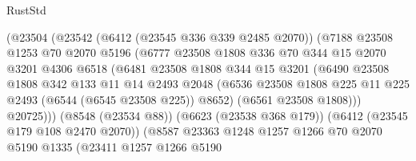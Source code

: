 \begin{lexlean}{RustStd}
\begin{coremodule}
                          (@23504
                            (@23542
                              (@6412 (@23545 @336 @339 @2485 @2070))
                              (@7188
                                @23508
                                @1253
                                @70
                                @2070
                                @5196
                                (@6777
                                  @23508
                                  @1808
                                  @336
                                  @70
                                  @344
                                  @15
                                  @2070
                                  @3201
                                  @4306
                                  @6518
                                  (@6481
                                    @23508
                                    @1808
                                    @344
                                    @15
                                    @3201
                                    (@6490
                                      @23508
                                      @1808
                                      @342
                                      @133
                                      @11
                                      @14
                                      @2493
                                      @2048
                                      (@6536
                                        @23508
                                        @1808
                                        @225
                                        @11
                                        @225
                                        @2493
                                        (@6544 (@6545 @23508 @225))
                                        @8652)
                                      (@6561 @23508 @1808)))
                                  @20725)))
                            (@8548 (@23534 @88))
                            (@6623 (@23538 @368 @179))
                            (@6412 (@23545 @179 @108 @2470 @2070))
                            (@8587
                              @23363
                              @1248
                              @1257
                              @1266
                              @70
                              @2070
                              @5190
                              @1335
                              (@23411
                                @1257
                                @1266
                                @5190

\end{coremodule}
\end{lexlean}
